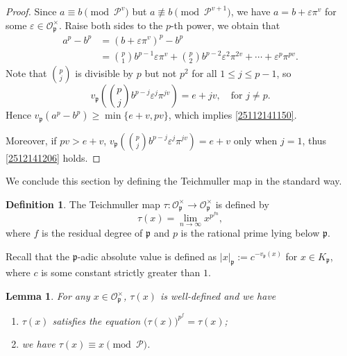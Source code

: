 \documentclass[12pt]{amsart}
\theoremstyle{plain}
\newtheorem{lem}{Lemma}[section]
\theoremstyle{definition}
\newtheorem{defn}{Definition}[section]
\theoremstyle{remark}
\numberwithin{equation}{section}
\begin{document}
	\begin{proof}
		Since $a\equiv b\!\!\pmod{\mathcal{P}^v}$ but $a\not\equiv b\!\!\pmod{\mathcal{P}^{v+1}}$, we have \( a = b + \varepsilon \pi^{v} \) for some $\varepsilon\in\mathcal{O}_\mathfrak{p}^{\times}$. Raise both sides to the $p$-th power, we obtain that
		\begin{equation}\label{2512141153}
			\begin{split}
				a^{p}-b^p& = (b  + \varepsilon \pi^{v})^p-b^p \\
				&= \binom{p}{1} b^{p-1}\varepsilon \pi^{v} + \binom{p}{2}b^{p-2} \varepsilon^2 \pi^{2v} + \cdots + \varepsilon^p \pi^{pv}. 
			\end{split} 
		\end{equation}
		Note that \( \binom{p}{j} \) is divisible by \( p \) but not \( p^2 \)  for all \( 1 \leq j \leq p-1 \), so
		\[
		v_\mathfrak{p} \left( \binom{p}{j}b^{p-j} \varepsilon^j \pi^{j v} \right) = e + jv,\quad \text{for $j\neq p$}.
		\]
		Hence
		\(
		v_\mathfrak{p} (a^p-b^p) \geq \min\{ e + v, p v \}
		\), which implies \eqref{25112141150}. 
		
		Moreover, if $pv>e+v$, $v_\mathfrak{p} \left( \binom{p}{j}b^{p-j} \varepsilon^j \pi^{j v} \right) = e + v$ only when $j=1$, thus \eqref{2512141206} holds. 
	\end{proof}
	
	We conclude this section by defining the Teichmuller map in the standard way. 
	\begin{defn}
		The Teichmuller map $\tau\colon\mathcal{O}_{\mathfrak{p}}^{\times}\to\mathcal{O}_{\mathfrak{p}}^{\times}$ is defined by
		\begin{equation}\label{2505091040}
			\tau(x)=\lim_{n\to\infty}x^{p^{fn}},
		\end{equation}
		where  $f$ is the residual degree of $\mathfrak{p}$ and $p$ is the rational prime lying below $\mathfrak{p}$. 
	\end{defn}
	
	Recall that the $\mathfrak{ p}$-adic absolute value is defined as $|x|_\mathfrak{p}:=c^{-v_{\mathfrak{p}}(x)}$ for $x\in K_\mathfrak{ p}$, where $c$ is some constant strictly greater than $1$.
	\begin{lem}\label{25050091445}     	
		For any $x \in \mathcal{O}_{\mathfrak{p}}^{\times}$, $\tau(x)$ is well-defined and we have 
		\begin{enumerate}[\upshape(i)]
			\item\label{2505091447}  $\tau(x)$ satisfies the equation $\big(\tau(x)\big)^{p^f}=\tau(x)$;
			\item\label{2505091446}  we have $\tau(x)\equiv x\pmod{\mathcal{P}}$. 
		\end{enumerate}
	\end{lem}
	
\end{document}
